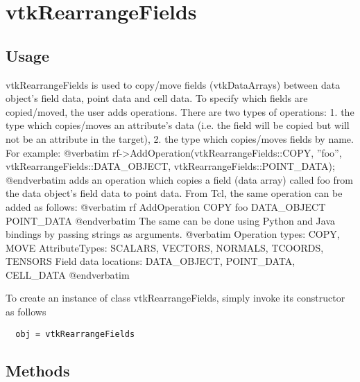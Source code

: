 \section{vtkRearrangeFields}

\subsection{Usage}

 vtkRearrangeFields is used to copy/move fields (vtkDataArrays) between
 data object's field data, point data and cell data. To specify which
 fields are copied/moved, the user adds operations. There are two types
 of operations: 1. the type which copies/moves an attribute's data
 (i.e. the field will be copied but will not be an attribute in the
 target), 2. the type which copies/moves fields by name. For example:
 @verbatim
 rf->AddOperation(vtkRearrangeFields::COPY, ''foo'', 
                  vtkRearrangeFields::DATA\_OBJECT, 
                  vtkRearrangeFields::POINT\_DATA);
 @endverbatim
 adds an operation which copies a field (data array) called foo from
 the data object's field data to point data.
 From Tcl, the same operation can be added as follows:
 @verbatim
 rf AddOperation COPY foo DATA\_OBJECT POINT\_DATA
 @endverbatim
 The same can be done using Python and Java bindings by passing
 strings as arguments.
 @verbatim
 Operation types: COPY, MOVE
 AttributeTypes: SCALARS, VECTORS, NORMALS, TCOORDS, TENSORS
 Field data locations: DATA\_OBJECT, POINT\_DATA, CELL\_DATA
 @endverbatim

To create an instance of class vtkRearrangeFields, simply
invoke its constructor as follows
\begin{verbatim}
  obj = vtkRearrangeFields
\end{verbatim}
\subsection{Methods}

